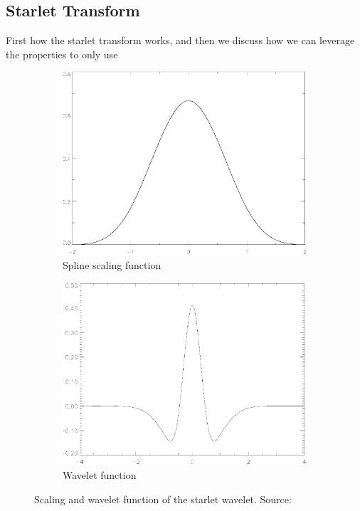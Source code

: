 \subsection{Starlet Transform} \label{cd:starlets}
First how the starlet transform works, and then we discuss how we can leverage the properties to only use

\begin{figure}[h]
	\centering
	\begin{subfigure}[b]{0.4\linewidth}
		\includegraphics[width=\linewidth]{./chapters/05.algorithms/starlets/scaling.png}
		\caption{Spline scaling function}
		\label{cd:starlets:scaling}
	\end{subfigure}
	\begin{subfigure}[b]{0.4\linewidth}
		\includegraphics[width=\linewidth]{./chapters/05.algorithms/starlets/wavelet.png}
		\caption{Wavelet function}
		\label{cd:starlets:wavelet}
	\end{subfigure}
	\caption{Scaling and wavelet function of the starlet wavelet. Source: \cite{starck2015starlet}}
	\label{cd:starlets:figure}
\end{figure}

